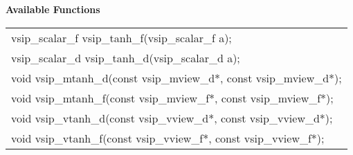\\\cvsiplh
\\ \hspace*{.8cm} \vspace*{.1cm} \textbf{Available Functions }
\\ \hspace*{1.1cm} {
\ttfamily
\begin{tabular}[H]{l}
vsip\_scalar\_f vsip\_tanh\_f(vsip\_scalar\_f a);\\
vsip\_scalar\_d vsip\_tanh\_d(vsip\_scalar\_d a);\\
void vsip\_mtanh\_d(const vsip\_mview\_d*, const vsip\_mview\_d*);\\
void vsip\_mtanh\_f(const vsip\_mview\_f*, const vsip\_mview\_f*);\\
void vsip\_vtanh\_d(const vsip\_vview\_d*, const vsip\_vview\_d*);\\
void vsip\_vtanh\_f(const vsip\_vview\_f*, const vsip\_vview\_f*);\\
\end{tabular}
}
\\\pyjvsiph
{}
